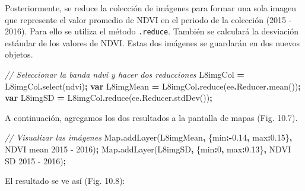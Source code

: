 \documentclass[
  12pt,
  letterpaper,
  twoside]{book}
\newenvironment{Shaded}{\begin{snugshade}}{\end{snugshade}}
\newcommand{\AttributeTok}[1]{\textcolor[rgb]{0.77,0.63,0.00}{#1}}
\newcommand{\BuiltInTok}[1]{#1}
\newcommand{\CommentTok}[1]{\textcolor[rgb]{0.56,0.35,0.01}{\textit{#1}}}
\newcommand{\DataTypeTok}[1]{\textcolor[rgb]{0.13,0.29,0.53}{#1}}
\newcommand{\DecValTok}[1]{\textcolor[rgb]{0.00,0.00,0.81}{#1}}
\newcommand{\FloatTok}[1]{\textcolor[rgb]{0.00,0.00,0.81}{#1}}
\newcommand{\FunctionTok}[1]{\textcolor[rgb]{0.00,0.00,0.00}{#1}}
\newcommand{\KeywordTok}[1]{\textcolor[rgb]{0.13,0.29,0.53}{\textbf{#1}}}
\newcommand{\NormalTok}[1]{#1}
\newcommand{\OperatorTok}[1]{\textcolor[rgb]{0.81,0.36,0.00}{\textbf{#1}}}
\newcommand{\StringTok}[1]{\textcolor[rgb]{0.31,0.60,0.02}{#1}}
\begin{document}
Posteriormente, se reduce la colección de imágenes para formar una sola imagen que represente el valor promedio de NDVI en el periodo de la colección (2015 - 2016). Para ello se utiliza el método \texttt{.reduce}. También se calculará la desviación estándar de los valores de NDVI. Estas dos imágenes se guardarán en dos nuevos objetos.

\begin{Shaded}
\begin{Highlighting}[]
\CommentTok{// Seleccionar la banda ndvi y hacer dos reducciones}
\NormalTok{L8imgCol }\OperatorTok{=}\NormalTok{ L8imgCol}\OperatorTok{.}\FunctionTok{select}\NormalTok{(}\StringTok{\textquotesingle{}ndvi\textquotesingle{}}\NormalTok{)}\OperatorTok{;}
\KeywordTok{var}\NormalTok{ L8imgMean }\OperatorTok{=}\NormalTok{ L8imgCol}\OperatorTok{.}\FunctionTok{reduce}\NormalTok{(ee}\OperatorTok{.}\AttributeTok{Reducer}\OperatorTok{.}\FunctionTok{mean}\NormalTok{())}\OperatorTok{;}
\KeywordTok{var}\NormalTok{ L8imgSD }\OperatorTok{=}\NormalTok{ L8imgCol}\OperatorTok{.}\FunctionTok{reduce}\NormalTok{(ee}\OperatorTok{.}\AttributeTok{Reducer}\OperatorTok{.}\FunctionTok{stdDev}\NormalTok{())}\OperatorTok{;}
\end{Highlighting}
\end{Shaded}

A continuación, agregamos los dos resultados a la pantalla de mapas (Fig. 10.7).

\begin{Shaded}
\begin{Highlighting}[]
\CommentTok{// Visualizar las imágenes}
\BuiltInTok{Map}\OperatorTok{.}\FunctionTok{addLayer}\NormalTok{(L8imgMean}\OperatorTok{,}\NormalTok{ \{}\DataTypeTok{min}\OperatorTok{:{-}}\FloatTok{0.14}\OperatorTok{,} \DataTypeTok{max}\OperatorTok{:}\FloatTok{0.15}\NormalTok{\}}\OperatorTok{,} \StringTok{\textquotesingle{}NDVI mean 2015 {-} 2016\textquotesingle{}}\NormalTok{)}\OperatorTok{;}
\BuiltInTok{Map}\OperatorTok{.}\FunctionTok{addLayer}\NormalTok{(L8imgSD}\OperatorTok{,}\NormalTok{ \{}\DataTypeTok{min}\OperatorTok{:}\DecValTok{0}\OperatorTok{,} \DataTypeTok{max}\OperatorTok{:}\FloatTok{0.13}\NormalTok{\}}\OperatorTok{,} \StringTok{\textquotesingle{}NDVI SD 2015 {-} 2016\textquotesingle{}}\NormalTok{)}\OperatorTok{;}
\end{Highlighting}
\end{Shaded}

El resultado se ve así (Fig. 10.8):
\end{document}
